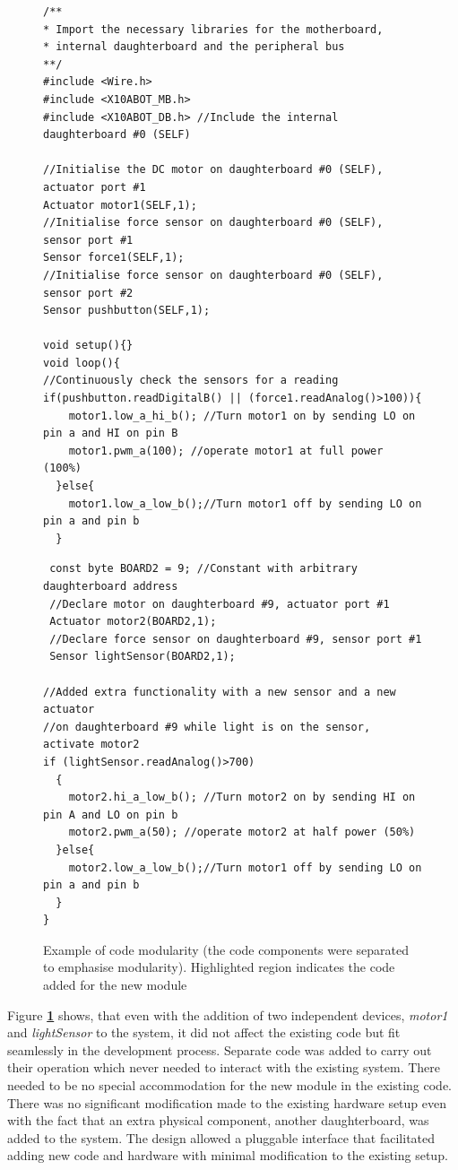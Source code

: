 \begin{figure}
		\footnotesize
        {\fontsize{8}{6}\selectfont
		
		\begin{verbatim}
        \end{verbatim}
        \begin{verbatim}
/**
* Import the necessary libraries for the motherboard, 
* internal daughterboard and the peripheral bus
**/
#include <Wire.h>  
#include <X10ABOT_MB.h>
#include <X10ABOT_DB.h> //Include the internal daughterboard #0 (SELF)

//Initialise the DC motor on daughterboard #0 (SELF), actuator port #1
Actuator motor1(SELF,1);
//Initialise force sensor on daughterboard #0 (SELF), sensor port #1
Sensor force1(SELF,1);
//Initialise force sensor on daughterboard #0 (SELF), sensor port #2
Sensor pushbutton(SELF,1);
   
void setup(){}
void loop(){
//Continuously check the sensors for a reading
if(pushbutton.readDigitalB() || (force1.readAnalog()>100)){
    motor1.low_a_hi_b(); //Turn motor1 on by sending LO on pin a and HI on pin B
    motor1.pwm_a(100); //operate motor1 at full power (100%) 
  }else{
    motor1.low_a_low_b();//Turn motor1 off by sending LO on pin a and pin b
  }
 \end{verbatim}
 \begin{verbatim}
 const byte BOARD2 = 9; //Constant with arbitrary daughterboard address
 //Declare motor on daughterboard #9, actuator port #1
 Actuator motor2(BOARD2,1);
 //Declare force sensor on daughterboard #9, sensor port #1
 Sensor lightSensor(BOARD2,1);
 
//Added extra functionality with a new sensor and a new actuator
//on daughterboard #9 while light is on the sensor, activate motor2
if (lightSensor.readAnalog()>700)
  {
    motor2.hi_a_low_b(); //Turn motor2 on by sending HI on pin A and LO on pin b
    motor2.pwm_a(50); //operate motor2 at half power (50%)
  }else{
    motor2.low_a_low_b();//Turn motor1 off by sending LO on pin a and pin b
  }
}	 
	\end{verbatim}
		}
    \caption{Example of code modularity (the code components were separated to emphasise modularity). Highlighted region indicates the code added for the new module} \label{code:modularity}
\end{figure}
Figure \textbf{\ref{code:modularity}} shows, that even with the addition of two independent devices, \emph{motor1} and \emph{lightSensor} to the system, it did not affect the existing code but fit seamlessly in the development process. Separate code was added to carry out their operation which never needed to interact with the existing system. There needed to be no special accommodation for the new module in the existing code. There was no significant modification made to the existing hardware setup even with the fact that an extra physical component, another daughterboard, was added to the system. The \xten design allowed a pluggable interface that facilitated adding new code and hardware with minimal modification to the existing setup.
